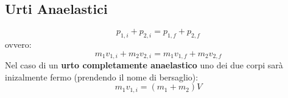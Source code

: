         \subsection*{Urti Anaelastici}
            \begin{equation*}
                p_{1,i} + p_{2,i} = p_{1,f} + p_{2,f}
            \end{equation*}
        ovvero:
            \begin{equation*}
                m_1v_{1,i} + m_2v_{2,i} = m_1v_{1,f} + m_2v_{2,f}
            \end{equation*}
        Nel caso di un \textbf{urto completamente anaelastico} uno dei due 
        corpi sarà inizalmente fermo (prendendo il nome di bersaglio):
        \begin{equation*}
            m_1v_{1,i} = (m_1+m_2)V
        \end{equation*}
        

